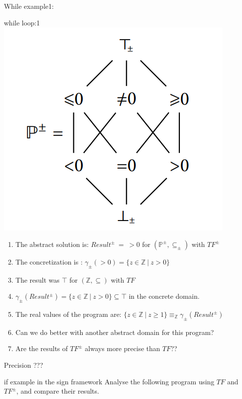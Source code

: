 \begin{frame}{While example1:}
\begin{exampleblock}{while loop:1}
	\centering 
	\centering \includegraphics[scale=0.60]{content/images/static-analysis/sign1.png}
			\begin{enumerate}
				\item The abstract solution is: $Result^{\pm}~=~>0$ for  $(\mathbb{P}^\pm, \subseteq_\pm)$ with $TF^{\scriptscriptstyle \pm}$
				\item The concretization is : $\gamma_{\pm}(>0)= \{z \in \mathbb{Z} ~|~ z>0 \}$
				\item The result was $\top$ for $(\mathbb{Z}, \subseteq)$ with $TF$
			    \item $\gamma_{\pm}(Result^{\pm})=\{z \in \mathbb{Z} ~|~ z>0 \} \subseteq \top$  in the concrete domain.
			    \item The real values of the program are: $\{z \in \mathbb{Z} ~|~ z \geq 1 \} \equiv_{\mathbb{Z}} {\displaystyle \gamma}_{\pm}(Result^{\pm})$
			    \item Can we do better with another abstract domain for this program?
			    \item Are the results of $TF^\pm$ always more precise than $TF$??
				\end{enumerate}
	
\end{exampleblock}
\end{frame}

\begin{frame}{Precision ???}
\begin{exampleblock}{if example in the sign framework }
	Analyse the following program using $TF$ and $TF^{\pm}$, and compare their results.

	\end{exampleblock}
\end{frame}


